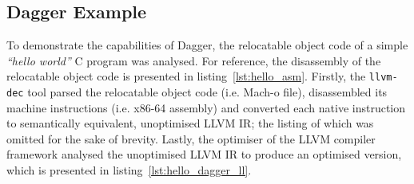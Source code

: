 
\subsection{Dagger Example}
\label{app:dagger_example}

To demonstrate the capabilities of Dagger, the relocatable object code of a simple \textit{``hello world''} C program was analysed. For reference, the disassembly of the relocatable object code is presented in listing~\ref{lst:hello_asm}. Firstly, the \texttt{llvm-dec} tool parsed the relocatable object code (i.e. Mach-o file), disassembled its machine instructions (i.e. x86-64 assembly) and converted each native instruction to semantically equivalent, unoptimised LLVM IR; the listing of which was omitted for the sake of brevity. Lastly, the optimiser of the LLVM compiler framework analysed the unoptimised LLVM IR to produce an optimised version, which is presented in listing~\ref{lst:hello_dagger_ll}.




